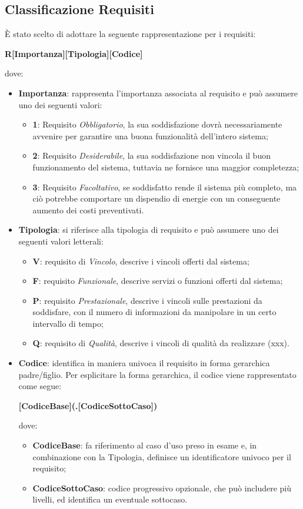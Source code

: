 \documentclass[a4paper]{article}
\begin{document}
\subsection{Classificazione Requisiti}

È stato scelto di adottare la seguente rappresentazione per i requisiti:

\begin{center}
\textbf{R[Importanza][Tipologia][Codice]}
\end{center}
dove:
\begin{itemize}
\item \textbf{Importanza}: rappresenta l’importanza associata al requisito e può assumere uno dei seguenti valori:
\begin{itemize}
	\item \textbf{1}: Requisito \textit{Obbligatorio}, la sua soddisfazione dovrà necessariamente avvenire per garantire una buona funzionalità dell’intero sistema;
	\item \textbf{2}: Requisito \textit{Desiderabile}, la sua soddisfazione non vincola il buon funzionamento del sistema, tuttavia ne fornisce una maggior completezza;
	\item \textbf{3}: Requisito \textit{Facoltativo}, se soddisfatto rende il sistema più completo, ma ciò potrebbe comportare un dispendio di energie con un conseguente aumento dei costi preventivati.
\end{itemize}
\item \textbf{Tipologia}: si riferisce alla tipologia di requisito e può assumere uno dei seguenti valori letterali:
\begin{itemize}
	\item \textbf{V}: requisito di \textit{Vincolo}, descrive i vincoli offerti dal sistema;
	\item \textbf{F}: requisito \textit{Funzionale}, descrive servizi o funzioni offerti dal sistema;
	\item \textbf{P}: requisito \textit{Prestazionale}, descrive i vincoli sulle prestazioni da soddisfare, con il numero di informazioni da manipolare in un certo intervallo di tempo;
	\item \textbf{Q}: requisito di \textit{Qualità}, descrive i vincoli di qualità da realizzare (xxx).
\end{itemize}
\item \textbf{Codice}: identifica in maniera univoca il requisito in forma gerarchica padre/figlio.
Per esplicitare la forma gerarchica, il codice viene rappresentato come segue:
\begin{center}
\textbf{[CodiceBase](.[CodiceSottoCaso])}
\end{center}
dove: 
\begin{itemize}
	\item \textbf{CodiceBase}: fa riferimento al caso d’uso preso in esame e, in combinazione con la Tipologia, definisce un identificatore univoco per il requisito;
	\item \textbf{CodiceSottoCaso}: codice progressivo opzionale, che può includere più livelli, ed identifica un eventuale sottocaso.
\end{itemize}
\end{itemize}
\end{document}
